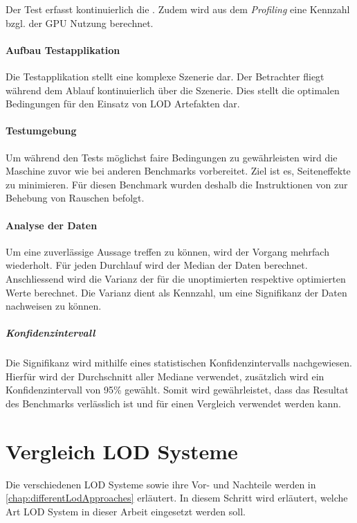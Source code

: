 Der Test erfasst kontinuierlich die . Zudem wird aus dem \emph{Profiling} eine Kennzahl bzgl. der GPU Nutzung berechnet.

\paragraph{Aufbau Testapplikation}
Die Testapplikation stellt eine komplexe Szenerie dar. Der Betrachter fliegt während dem Ablauf kontinuierlich über die Szenerie. Dies stellt die optimalen Bedingungen für den Einsatz von LOD Artefakten dar.

\paragraph{Testumgebung}
Um während den Tests möglichst faire Bedingungen zu gewährleisten wird die Maschine zuvor wie bei anderen Benchmarks vorbereitet. Ziel ist es, Seiteneffekte zu minimieren. Für diesen Benchmark wurden deshalb die Instruktionen von  zur Behebung von Rauschen befolgt.
\cite{tracerBenchNoiseMitigation}

\paragraph{Analyse der Daten}
Um eine zuverlässige Aussage treffen zu können, wird der Vorgang mehrfach wiederholt. Für jeden Durchlauf wird der Median der  Daten berechnet.
Anschliessend wird die Varianz der  für die unoptimierten respektive optimierten Werte berechnet. Die Varianz dient als Kennzahl, um eine Signifikanz der Daten nachweisen zu können.

\subparagraph{Konfidenzintervall}
Die Signifikanz wird mithilfe eines statistischen Konfidenzintervalls nachgewiesen. Hierfür wird der Durchschnitt aller Mediane verwendet, zusätzlich wird ein Konfidenzintervall von 95\% gewählt. Somit wird gewährleistet, dass das Resultat des Benchmarks verlässlich ist und für einen Vergleich verwendet werden kann.

\section{Vergleich LOD Systeme}
Die verschiedenen LOD Systeme sowie ihre Vor- und Nachteile werden in \autoref{chap:differentLodApproaches} erläutert. In diesem Schritt wird erläutert, welche Art LOD System in dieser Arbeit eingesetzt werden soll.

